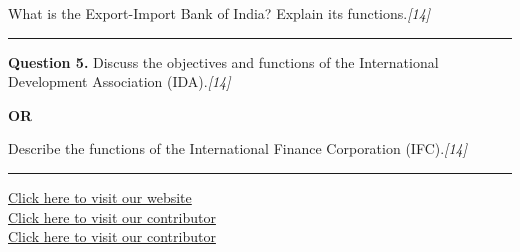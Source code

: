 \documentclass[11pt,a4paper]{article}
\newcommand{\pts}[1]{\hfill   \textit{[#1]}}
\begin{document}
What is the Export-Import Bank of India? Explain its functions.\pts{14}

\medskip\rule{\linewidth}{0.2pt}




\noindent   \textbf{Question 5.}
Discuss the objectives and functions of the International Development Association (IDA).\pts{14}

\centerline{   \textbf{OR}}

Describe the functions of the International Finance Corporation (IFC).\pts{14}

\vfill
\rule{\linewidth}{0.4pt}

\begin{center}\small
\href{https://bhu-exam.vercel.app/}{Click here to visit our website}\\[4pt]
\href{https://me-aryan.vercel.app/}{Click here to visit our contributor}\\[4pt]
\href{https://quashan-me.vercel.app/}{Click here to visit our contributor}
\end{center}
\end{document}
